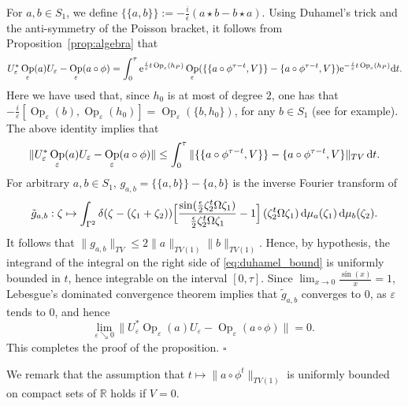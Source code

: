 \documentclass[12pt]{article}
\DeclareMathOperator{\Op}{Op}
\renewcommand{\d}{{\rm d}}
\newcommand{\e}{{\rm e}}
\begin{document}
	For $a,b\in S_1$, we define $\{\{a,b\}\}:=-\frac i\epsilon (a\star b-b\star a)$. Using Duhamel's trick and the 
	anti-symmetry of the Poisson bracket, it follows from Proposition~\ref{prop:algebra} that
	$$U_{\varepsilon}^*\Op_\varepsilon(a)U_\varepsilon - \Op_\varepsilon(a\circ\phi)=
	\int_0^{\tau} \e^{\frac{i}{\varepsilon}t\Op_\varepsilon(h_P)}\Op_\varepsilon(\{\{a\circ\phi^{\tau-t},V\}\} 
	-\{a\circ\phi^{\tau-t},V\})\e^{-\frac i\varepsilon t\Op_\varepsilon(h_P)} \d t.$$
	Here we have used that, since $h_0$ is at most of degree $2$, one has that $-\frac{i}{\varepsilon}[\Op_{\varepsilon}(b),
	\Op_\varepsilon(h_0)]=\Op_\varepsilon(\{b,h_0\})$, for any $b\in S_1$ (see \cite[Theorem~10.13]{DerGerard} for example).
	The above identity implies that
	\begin{align}\label{eq:duhamel_bound}
		\|U_{\varepsilon}^*\Op_\varepsilon(a)U_\varepsilon - \Op_\varepsilon(a\circ\phi)\|\leq 
		\int_0^{\tau}\|\{\{a\circ\phi^{\tau-t},V\}\} -\{a\circ\phi^{\tau-t},V\}\|_{TV}\,\d t.
	\end{align}
	For arbitrary $a,b\in S_1$, $g_{a,b}=\{\{a,b\}\} -\{a,b\}$ is the inverse Fourier transform of
	$$\tilde g_{a,b}:\zeta\mapsto\int_{\Gamma^2}\delta(\zeta-(\zeta_1+\zeta_2))\Big[\frac{\operatorname{sin}(\tfrac\epsilon 2 \zeta_2^t\Omega \zeta_1)}{\tfrac\epsilon 2 \zeta_2^t\Omega \zeta_1}-1\Big]\,(\zeta_2^t\Omega\zeta_1)\,\d \mu_a(\zeta_1)
	\,\d \mu_b(\zeta_2).$$
	It follows that $\|g_{a,b}\|_{TV}\leq 2\|a\|_{TV(1)}\|b\|_{TV(1)}$. Hence, by hypothesis, the integrand of the integral on
	the right side of \eqref{eq:duhamel_bound} is uniformly bounded in $t$, hence integrable on the interval $[0,\tau]$. 
	Since $\lim_{x\to 0}\frac{\operatorname{sin}(x)}{x}=1$, Lebesgue's dominated convergence theorem implies
	that $\tilde{g}_{a,b}$ converges to $0$, as $\varepsilon$ tends to 0, and hence 
	$$\underset{\varepsilon \searrow 0}{\text{lim}}\, \|U_{\varepsilon}^*\Op_\varepsilon(a)U_\varepsilon - \Op_\varepsilon(a\circ\phi)\| 
	= 0.$$
	This completes the proof of the proposition. \hfill{$\square$}
	
\vspace{0.15cm} We remark that the assumption that $t\mapsto \|a\circ\phi^t\|_{TV(1)}$ is uniformly bounded on compact 
sets of $\mathbb{R}$ holds if $V=0$.
\end{document}
